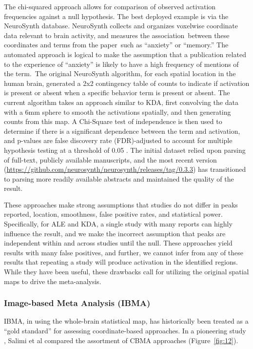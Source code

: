 \documentclass{report}
\begin{document}
The chi-squared approach allows for comparison of observed activation
frequencies against a null hypothesis. The best deployed example is via
the NeuroSynth database. NeuroSynth collects and organizes voxelwise
coordinate data relevant to brain activity, and measures the
association~between these coordinates and terms from the paper~such as
``anxiety'' or ``memory.'' The automated approach is logical to make the
assumption that a publication related to the experience of ``anxiety''
is likely to have a high frequency of mentions of the term.~The original
NeuroSynth algorithm, for each spatial location in the human brain,
generated a 2x2 contingency table of counts to indicate if activation is
present or absent when a specific behavior term is present or absent.
The current algorithm takes an approach similar to KDA, first convolving
the data with a 6mm sphere to smooth the activations spatially, and then
generating counts from this map. A Chi-Square test of independence is
then used to determine if there is a significant dependence between the
term and activation, and p-values are false discovery rate
(FDR)-adjusted to account for multiple hypothesis testing at a threshold
of 0.05 \cite{Yarkoni2011-rg}. The initial dataset relied upon parsing of full-text, publicly
available manuscripts, and the most recent version
(\href{https://github.com/neurosynth/neurosynth/releases/tag/0.3.3}{https://github.com/neurosynth/neurosynth/releases/tag/0.3.3}) has
transitioned to parsing more readily available abstracts and maintained
the quality of the result.

These approaches make strong assumptions that studies do not differ in
peaks reported, location, smoothness, false positive rates, and
statistical power. Specifically, for ALE and KDA, a single study with
many reports can highly influence the result, and we make the incorrect
assumption that peaks are independent within and across studies until
the null. These approaches yield results with many false positives, and
further, we cannot infer from any of these results that repeating a
study will produce activation in the identified regions. While they have
been useful, these drawbacks call for utilizing the original spatial
maps to drive the meta-analysis.

\subsubsection{Image-based Meta Analysis (IBMA)}

IBMA, in using the whole-brain statistical map, has historically been
treated as a ``gold standard'' for assessing coordinate-based
approaches. In a pioneering study \cite{Salimi-Khorshidi2009-if},
Salimi et al compared the assortment of CBMA approaches (Figure~\ref{fig:12}).
\end{document}
